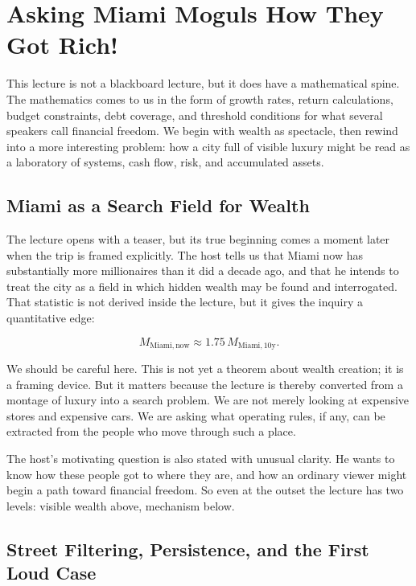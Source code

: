\chapter{Asking Miami Moguls How They Got Rich!}

This lecture is not a blackboard lecture, but it does have a mathematical spine. The mathematics comes to us in the form of growth rates, return calculations, budget constraints, debt coverage, and threshold conditions for what several speakers call financial freedom. We begin with wealth as spectacle, then rewind into a more interesting problem: how a city full of visible luxury might be read as a laboratory of systems, cash flow, risk, and accumulated assets.

\section{Miami as a Search Field for Wealth}

The lecture opens with a teaser, but its true beginning comes a moment later when the trip is framed explicitly. The host tells us that Miami now has substantially more millionaires than it did a decade ago, and that he intends to treat the city as a field in which hidden wealth may be found and interrogated. That statistic is not derived inside the lecture, but it gives the inquiry a quantitative edge:

\begin{equation}
M_{\mathrm{Miami,now}} \approx 1.75\,M_{\mathrm{Miami,10y}}.
\end{equation}

We should be careful here. This is not yet a theorem about wealth creation; it is a framing device. But it matters because the lecture is thereby converted from a montage of luxury into a search problem. We are not merely looking at expensive stores and expensive cars. We are asking what operating rules, if any, can be extracted from the people who move through such a place.

The host's motivating question is also stated with unusual clarity. He wants to know how these people got to where they are, and how an ordinary viewer might begin a path toward financial freedom. So even at the outset the lecture has two levels: visible wealth above, mechanism below.

\section{Street Filtering, Persistence, and the First Loud Case}

